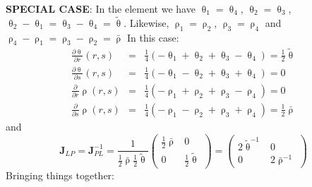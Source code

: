 {\bf SPECIAL CASE}: In the element we have 
$\uptheta_1=\uptheta_4$, $\uptheta_2=\uptheta_3$, 
$\uptheta_2-\uptheta_1=\uptheta_3-\uptheta_4=\tilde{\uptheta}$.
Likewise, 
$\uprho_1=\uprho_2$, $\uprho_3=\uprho_4$ and 
$\uprho_4-\uprho_1=\uprho_3-\uprho_2=\bar{\uprho}$
In this case:
\begin{eqnarray}
\frac{\partial\uptheta}{\partial r}(r,s) 
&=& \frac14 (-\uptheta_1 + \uptheta_2 + \uptheta_3 - \uptheta_4) =\frac12 \tilde{\uptheta}\\
\frac{\partial\uptheta}{\partial s}(r,s) 
&=& \frac14 (-\uptheta_1 - \uptheta_2 + \uptheta_3 + \uptheta_4) =0\\
\frac{\partial}{\partial r}\uprho(r,s)   
&=& \frac14 (-\uprho_1 + \uprho_2 + \uprho_3 - \uprho_4) = 0\\
\frac{\partial}{\partial s}\uprho(r,s)   
&=& \frac14 (-\uprho_1 - \uprho_2 + \uprho_3 + \uprho_4) =\frac12 \bar{\uprho}
\end{eqnarray}
and
\begin{equation}
\boxed{
{\bm J}_{LP}={\bm J}_{PL}^{-1} 
= \frac{1}{\frac12\bar{\uprho} \frac12\tilde{\uptheta}} 
\left(
\begin{array}{cc}
\frac12 \bar{\uprho} & 0 \\
0 & \frac12\tilde{\uptheta}
\end{array}
\right)
=
\left(
\begin{array}{cc}
2\tilde{\uptheta}^{-1} & 0 \\
0 &  2\bar{\uprho}^{-1}
\end{array}
\right)}
\end{equation}
Bringing things together:
